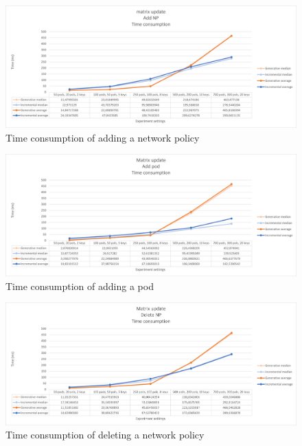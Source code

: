 \begin{figure}[H]
    \centering
    \includegraphics[width=\textwidth]{images/experiment1/addNP-time.png}
    \caption{Time consumption of adding a network policy}
    \label{fig:exp1-addNP-time}
\end{figure}
\begin{figure}[H]
    \centering
    \includegraphics[width=\textwidth]{images/experiment1/addPod-time.png}
    \caption{Time consumption of adding a pod}
    \label{fig:exp1-addPod-time}
\end{figure}
\begin{figure}[H]
    \centering
    \includegraphics[width=\textwidth]{images/experiment1/delNP-time.png}
    \caption{Time consumption of deleting a network policy}
    \label{fig:exp1-delNP-time}
\end{figure}
